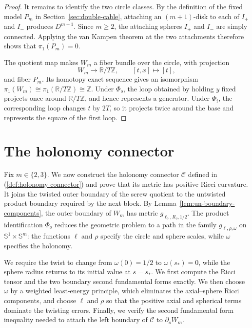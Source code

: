 \documentclass[11pt,reqno]{amsart}
\theoremstyle{definition}
\numberwithin{equation}{section}
\begin{document}
\begin{proof}
It remains to identify the two circle classes.  By the definition of
the fixed model $P_m$ in Section~\ref{sec:double-cable}, attaching an
\((m+1)\)-disk to each of \(I_+\) and \(I_-\) produces $D^{m+1}$.
Since \(m\ge2\), the attaching spheres \(I_+\) and
\(I_-\) are simply connected.  Applying the van Kampen theorem
at the two attachments therefore shows that
\(\pi_1(P_m)=0\).

The quotient map makes \(W_m\) a fiber bundle over the circle, with
projection
\[
 W_m\longrightarrow\mathbb R/T\mathbb Z,
 \qquad [t,x]\longmapsto[t],
\]
and fiber \(P_m\).  Its homotopy exact sequence gives an isomorphism
\(\pi_1(W_m)\cong\pi_1(\mathbb R/T\mathbb Z)\cong\mathbb Z\).  Under
\(\Phi_o\), the loop obtained by holding \(y\) fixed projects once around
\(\mathbb R/T\mathbb Z\), and hence represents a generator.  Under
\(\Phi_i\), the corresponding loop changes \(t\) by \(2T\), so it projects
twice around the base and represents the square of the first loop.
\end{proof}



\section{The holonomy connector}
\label{sec:holonomy-connector}

Fix \(m\in\{2,3\}\).  We now construct the holonomy connector $\mathcal C$ defined in (\ref{def:holonomy-connector}) and prove that its metric has positive Ricci
curvature.  It joins the twisted outer boundary of the screw quotient to
the untwisted product boundary required by the next block.  By
Lemma~\ref{lem:un-boundary-components}, the outer boundary of
\(W_m\) has metric \(g_{\ell_o,R_o,1/2}\).  The product identification
\(\Phi_o\) reduces the geometric problem to a path in the family
\(g_{\ell,\rho,\omega}\) on
\(\mathbb S^1\times\mathbb S^m\): the functions \(\ell\) and \(\rho\)
specify the circle and sphere scales, while \(\omega\) specifies the
holonomy.

We require the twist to change from \(\omega(0)=1/2\) to
\(\omega(s_*)=0\), while the sphere radius returns to its initial value
at \(s=s_*\).  We first compute the Ricci tensor and the two boundary
second fundamental forms exactly.  We then choose \(\omega\) by a
weighted least-energy principle, which eliminates the axial--sphere
Ricci components, and choose \(\ell\) and \(\rho\) so that the positive
axial and spherical terms dominate the twisting errors.  Finally, we
verify the second fundamental form inequality needed to attach the
left boundary of $\mathcal C$ to \(\partial_oW_m\).
\end{document}
